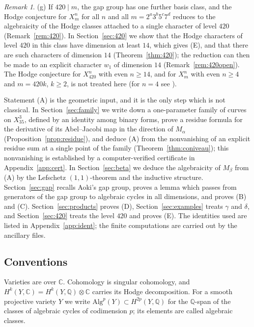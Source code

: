 \documentclass[11pt]{amsart}
\theoremstyle{definition}
\theoremstyle{remark}
\newtheorem{remark}[theorem]{Remark}
\numberwithin{equation}{section}
\newcommand{\Q}{\mathbb{Q}}
\newcommand{\C}{\mathbb{C}}
\begin{document}
\begin{remark}
(g) If $420\mid m$, the gap group has one further basis class, and the Hodge conjecture for $X^n_m$ for all $n$ and all $m=2^a3^b5^c7^d$ reduces to the algebraicity of the Hodge classes attached to a single character of level $420$ (Remark~\ref{rem:420}). In Section~\ref{sec:420} we show that the Hodge characters of level $420$ in this class have dimension at least $14$, which gives (E), and that there are such characters of dimension $14$ (Theorem~\ref{thm:420}); the reduction can then be made to an explicit character $w_1$ of dimension $14$ (Remark~\ref{rem:420open}). The Hodge conjecture for $X^n_{420}$ with even $n\ge14$, and for $X^n_m$ with even $n\ge4$ and $m=420k$, $k\ge2$, is not treated here (for $n=4$ see \cite[Cor.~3.2]{Ka16}).
\end{remark}

Statement (A) is the geometric input, and it is the only step which is not classical. In Section~\ref{sec:family} we write down a one-parameter family of curves on $X^3_{35}$, defined by an identity among binary forms, prove a residue formula for the derivative of its Abel--Jacobi map in the direction of $M_\alpha$ (Proposition~\ref{prop:residue}), and deduce (A) from the nonvanishing of an explicit residue sum at a single point of the family (Theorem~\ref{thm:coniveau}); this nonvanishing is established by a computer-verified certificate in Appendix~\ref{app:cert}. In Section~\ref{sec:beta} we deduce the algebraicity of $M_\beta$ from (A) by the Lefschetz $(1,1)$-theorem and the inductive structure. Section~\ref{sec:gap} recalls Aoki's gap group, proves a lemma which passes from generators of the gap group to algebraic cycles in all dimensions, and proves (B) and (C). Section~\ref{sec:products} proves (D), Section~\ref{sec:examples} treats $\gamma$ and $\delta$, and Section~\ref{sec:420} treats the level $420$ and proves (E). The identities used are listed in Appendix~\ref{app:ident}; the finite computations are carried out by the ancillary files.

\subsection*{Conventions} Varieties are over $\C$. Cohomology is singular cohomology, and $H^k(Y,\C)=H^k(Y,\Q)\otimes\C$ carries its Hodge decomposition. For a smooth projective variety $Y$ we write $\mathrm{Alg}^p(Y)\subset H^{2p}(Y,\Q)$ for the $\Q$-span of the classes of algebraic cycles of codimension $p$; its elements are called algebraic classes.
\end{document}
